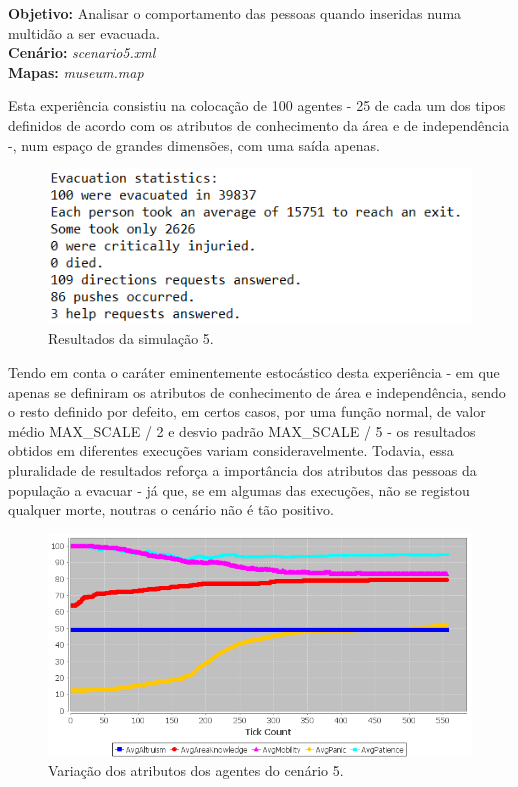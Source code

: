 \documentclass[12pt]{article}
\begin{document}
\begin{titlepage}
\begin{itemize}
\textbf{Objetivo:} 
Analisar o comportamento das pessoas quando inseridas numa multidão a ser evacuada.
\\\textbf{Cenário:} 
\textit{scenario5.xml}
\\\textbf{Mapas:} 
\textit{museum.map}
\newline

Esta experiência consistiu na colocação de 100 agentes - 25 de cada um dos tipos definidos de acordo com os atributos de conhecimento da área e de independência -, num espaço de grandes dimensões, com uma saída apenas.

\begin{figure}[H]
	\centering
	\includegraphics{log_sc5.png}
	\caption{Resultados da simulação 5.}
	\label{log_sc5}
\end{figure}

Tendo em conta o caráter eminentemente estocástico desta experiência - em que apenas se definiram os atributos de conhecimento de área e independência, sendo o resto definido por defeito, em certos casos, por uma função normal, de valor médio MAX\_SCALE / 2 e desvio padrão MAX\_SCALE / 5 - os resultados obtidos em diferentes execuções variam consideravelmente.
Todavia, essa pluralidade de resultados reforça a importância dos atributos das pessoas da população a evacuar - já que, se em algumas das execuções, não se registou qualquer morte, noutras o cenário não é tão positivo.

\begin{figure}[H]
	\centering
	\includegraphics{graph_sc5_1.png}
	\caption{Variação dos atributos dos agentes do cenário 5.}
	\label{graph_sc5}
\end{figure}


\end{itemize}
\end{titlepage}
\end{document}
